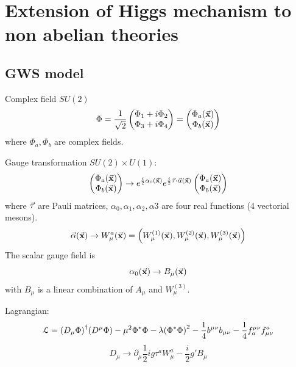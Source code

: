 \documentclass[../main/main.tex]{subfiles}
\begin{document}
\section{Extension of Higgs mechanism to non abelian theories}

\subsection{GWS model}
Complex field \( SU(2) \)
\begin{equation}
  \Phi = \frac{1}{\sqrt{2} } \begin{pmatrix}
  \Phi _1 + i \Phi _2 \\
  \Phi _3 + i \Phi _4
  \end{pmatrix}
  =
  \begin{pmatrix}
  \Phi _a (\va{x}) \\
  \Phi _b (\va{x})
  \end{pmatrix}
\end{equation}
where \( \Phi _a, \Phi _b \) are complex fields.

Gauge transformation \( SU(2) \times U(1) \):
\begin{equation}
  \begin{pmatrix}
  \Phi _a (\va{x}) \\
  \Phi _b (\va{x})
  \end{pmatrix}
  \rightarrow
  e^{\frac{i}{2} \alpha _0 (\va{x})} e^{\frac{i}{2} \va{\tau } \vdot \va{\alpha } (\va{x})}
  \begin{pmatrix}
  \Phi _a (\va{x}) \\
  \Phi _b (\va{x})
  \end{pmatrix}
\end{equation}
where \( \va{\tau } \) are Pauli matrices, \( \alpha _0, \alpha _1, \alpha _2, \alpha 3 \) are four real functions (4 vectorial mesons).
\begin{equation}
  \va{\alpha } (\va{x}) \rightarrow W _ \mu ^ a (\va{x}) = \qty( W_ \mu ^{(1)} (\va{x}),  W_ \mu ^{(2)} (\va{x}),  W_ \mu ^{(3)} (\va{x}) )
\end{equation}
The scalar gauge field is
\begin{equation}
  \alpha _0 (\va{x}) \rightarrow B _ \mu (\va{x})
\end{equation}
with \( B _ \mu  \) is a linear combination of \( A_ \mu  \) and \(  W_ \mu ^{(3)}  \).

Lagrangian:
\begin{equation}
  \mathcal{L} = \qty(D_ \mu \Phi )^\dagger \qty(D ^ \mu \Phi ) - \mu ^2 \Phi ^* \Phi - \lambda \qty(\Phi ^* \Phi )^2
  - \frac{1}{4} b^{\mu \nu } b_{\mu \nu } - \frac{1}{4} f_a^{\mu \nu } f_{\mu \nu }^a
\end{equation}
\begin{equation}
  D_ \mu  \rightarrow \partial_ \mu \frac{1}{2} i g \tau ^a W_ \mu ^a - \frac{i}{2} g' B _ \mu  
\end{equation}
\end{document}
